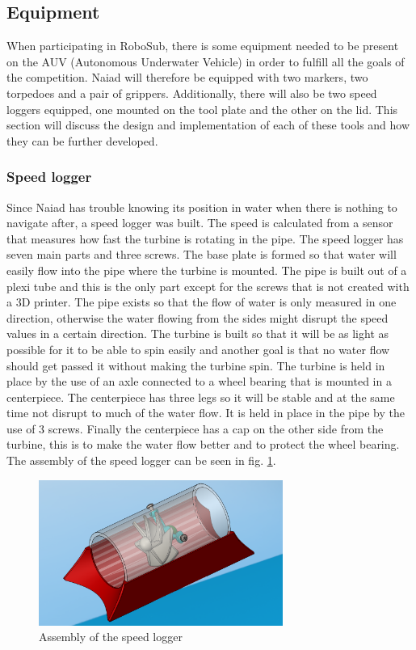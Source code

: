 \subsection{Equipment} %
\noindent When participating in RoboSub, there is some equipment needed to be present on the AUV (Autonomous Underwater Vehicle) in order to fulfill all the goals of the competition. Naiad will therefore be equipped with two markers, two torpedoes and a pair of grippers. Additionally, there will also be two speed loggers equipped, one mounted on the tool plate and the other on the lid. This section will discuss the design and implementation of each of these tools and how they can be further developed.   

\subsubsection{Speed logger} %
\label{SL_mec}
Since Naiad has trouble knowing its position in water when there is nothing to navigate after, a speed logger was built. The speed is calculated from a sensor that measures how fast the turbine is rotating in the pipe. The speed logger has seven main parts and three screws. The base plate is formed so that water will easily flow into the pipe where the turbine is mounted. The pipe is built out of a plexi tube and this is the only part except for the screws that is not created with a 3D printer. The pipe exists so that the flow of water is only measured in one direction, otherwise the water flowing from the sides might disrupt the speed values in a certain direction. The turbine is built so that it will be as light as possible for it to be able to spin easily and another goal is that no water flow should get passed it without making the turbine spin. The turbine is held in place by the use of an axle connected to a wheel bearing that is mounted in a centerpiece. The centerpiece has three legs so it will be stable and at the same time not disrupt to much of the water flow. It is held in place in the pipe by the use of 3 screws. Finally the centerpiece has a cap on the other side from the turbine, this is to make the water flow better and to protect the wheel bearing.  The assembly of the speed logger can be seen in fig. \ref{SpeedloggerImg}.

\begin{figure}[!ht]
	\begin{center}
		\includegraphics[width=80mm]{./Images/Mechanics/SpeedloggerImg.png}
		\caption{Assembly of the speed logger}
		\label{SpeedloggerImg}
	\end{center}
\end{figure}


